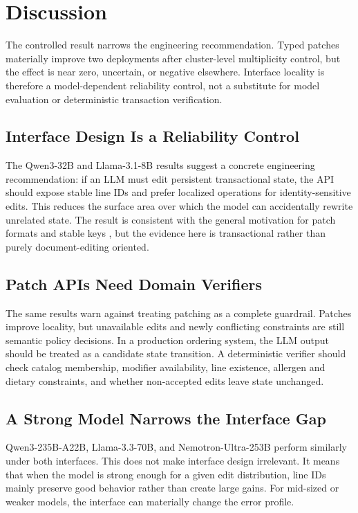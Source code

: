 \documentclass[11pt]{article}
\begin{document}
\begin{table}[H]
\centering
\small
\resizebox{\linewidth}{!}{}
\caption{Multi-label error taxonomy by interface. Values are
percentages of cases. Labels do not sum to 100\%.}
\label{tab:taxonomy}
\end{table}

\section{Discussion}
The controlled result narrows the engineering recommendation. Typed patches
materially improve two deployments after cluster-level multiplicity control,
but the effect is near zero, uncertain, or negative elsewhere. Interface
locality is therefore a model-dependent reliability control, not a substitute
for model evaluation or deterministic transaction verification.

\subsection{Interface Design Is a Reliability Control}
The Qwen3-32B and Llama-3.1-8B results suggest a concrete engineering
recommendation: if an LLM must edit persistent transactional state, the API
should expose stable line IDs and prefer localized operations for
identity-sensitive edits. This reduces the surface area over which the model
can accidentally rewrite unrelated state. The result is consistent with the
general motivation for patch formats and stable keys
\cite{rfc6902,duanis2025jsonwhisperer}, but the evidence here is transactional
rather than purely document-editing oriented.

\subsection{Patch APIs Need Domain Verifiers}
The same results warn against treating patching as a complete guardrail.
Patches improve locality, but unavailable edits and newly conflicting
constraints are still semantic policy decisions. In a production ordering
system, the LLM output should be treated as a candidate state transition. A
deterministic verifier should check catalog membership, modifier availability,
line existence, allergen and dietary constraints, and whether non-accepted
edits leave state unchanged.

\subsection{A Strong Model Narrows the Interface Gap}
Qwen3-235B-A22B, Llama-3.3-70B, and Nemotron-Ultra-253B perform similarly
under both interfaces. This does not make interface design irrelevant. It means
that when the model is strong enough for a given edit distribution, line IDs
mainly preserve good behavior rather than create large gains. For mid-sized or
weaker models, the interface can materially change the error profile.
\end{document}
